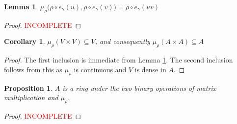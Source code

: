 \documentclass[12pt]{article}
\newtheorem{proposition}{Proposition}
\newtheorem{lemma}{Lemma}
\newtheorem{corollary}{Corollary}
\theoremstyle{definition}
\newcommand{\incomplete}{\textcolor{red}{INCOMPLETE}}
\newcommand{\inv}{^{-1}}
\begin{document}
\begin{lemma}
\label{multiplicative}
$\mu_\rho \Big( \rho  \circ e_\gamma(u), \rho \circ e_\gamma(v) \Big) = \rho \circ e_\gamma(uv)$
\end{lemma}
\begin{proof}
\incomplete
\end{proof}

\begin{corollary}
$\mu_\rho(V \times V) \subseteq V$, and consequently $\mu_\rho(A \times A) \subseteq A$
\end{corollary}
\begin{proof}
The first inclusion is immediate from Lemma \ref{multiplicative}. The second inclusion follows from this as $\mu_\rho$ is continuous and $V$ is dense in $A$.
\end{proof}

\begin{proposition}
$A$ is a ring under the two binary operations of matrix multiplication and $\mu_\rho$.
\end{proposition}
\begin{proof}
\incomplete
\end{proof}
\end{document}
